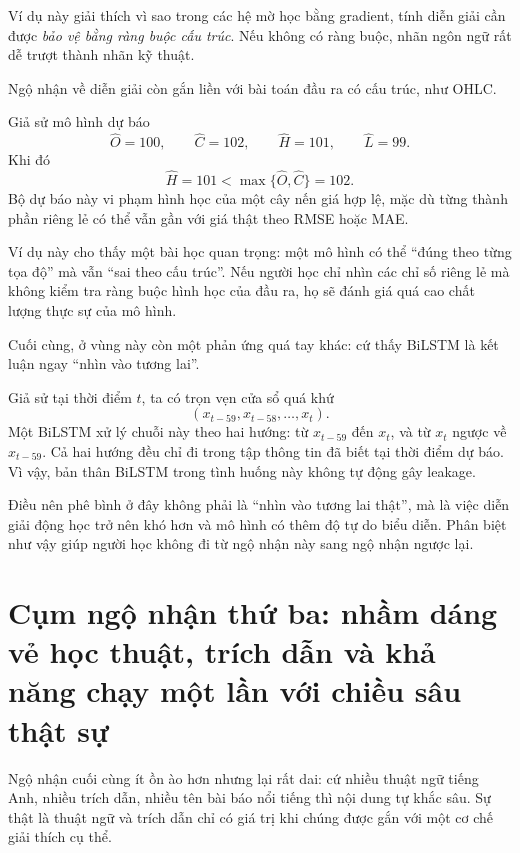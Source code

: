 Ví dụ này giải thích vì sao trong các hệ mờ học bằng gradient, tính diễn giải cần được \emph{bảo vệ bằng ràng buộc cấu trúc}. Nếu không có ràng buộc, nhãn ngôn ngữ rất dễ trượt thành nhãn kỹ thuật.

Ngộ nhận về diễn giải còn gắn liền với bài toán đầu ra có cấu trúc, như OHLC.

\begin{example}
Giả sử mô hình dự báo
\[
\widehat O = 100,\qquad
\widehat C = 102,\qquad
\widehat H = 101,\qquad
\widehat L = 99.
\]
Khi đó
\[
\widehat H = 101 < \max\{\widehat O,\widehat C\}=102.
\]
Bộ dự báo này vi phạm hình học của một cây nến giá hợp lệ, mặc dù từng thành phần riêng lẻ có thể vẫn gần với giá thật theo RMSE hoặc MAE.
\end{example}

Ví dụ này cho thấy một bài học quan trọng: một mô hình có thể ``đúng theo từng tọa độ'' mà vẫn ``sai theo cấu trúc''. Nếu người học chỉ nhìn các chỉ số riêng lẻ mà không kiểm tra ràng buộc hình học của đầu ra, họ sẽ đánh giá quá cao chất lượng thực sự của mô hình.

Cuối cùng, ở vùng này còn một phản ứng quá tay khác: cứ thấy BiLSTM là kết luận ngay ``nhìn vào tương lai''.

\begin{example}
Giả sử tại thời điểm \(t\), ta có trọn vẹn cửa sổ quá khứ
\[
(x_{t-59},x_{t-58},\dots,x_t).
\]
Một BiLSTM xử lý chuỗi này theo hai hướng: từ \(x_{t-59}\) đến \(x_t\), và từ \(x_t\) ngược về \(x_{t-59}\). Cả hai hướng đều chỉ đi trong tập thông tin đã biết tại thời điểm dự báo. Vì vậy, bản thân BiLSTM trong tình huống này không tự động gây leakage.
\end{example}

Điều nên phê bình ở đây không phải là ``nhìn vào tương lai thật'', mà là việc diễn giải động học trở nên khó hơn và mô hình có thêm độ tự do biểu diễn. Phân biệt như vậy giúp người học không đi từ ngộ nhận này sang ngộ nhận ngược lại.

\section{Cụm ngộ nhận thứ ba: nhầm dáng vẻ học thuật, trích dẫn và khả năng chạy một lần với chiều sâu thật sự}

Ngộ nhận cuối cùng ít ồn ào hơn nhưng lại rất dai: cứ nhiều thuật ngữ tiếng Anh, nhiều trích dẫn, nhiều tên bài báo nổi tiếng thì nội dung tự khắc sâu. Sự thật là thuật ngữ và trích dẫn chỉ có giá trị khi chúng được gắn với một cơ chế giải thích cụ thể.

